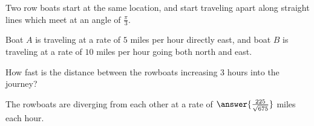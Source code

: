 \documentclass{ximera}
\author{Steven Gubkin}
\begin{document}
\begin{exercise}




        	Two row boats start at the same location, and start traveling apart along straight lines which meet at an angle of $\frac{\pi}{3}$.

        	Boat $A$ is traveling at a rate of $5$ miles per hour directly east, and boat $B$ is traveling at a rate of $10$ miles per hour going both north and east.

	How fast is the distance between the rowboats increasing $3$ hours into the journey? 

\begin{prompt}
	The rowboats are diverging from each other at a rate of $\answer{\frac{225}{\sqrt{675}}}$ miles each hour.
\end{prompt}

\end{exercise}
\end{document}
